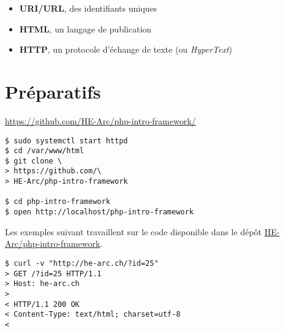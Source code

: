 \begin{itemize}
\tightlist
\item
  \textbf{URI/URL}, des identifiants uniques
\item
  \textbf{HTML}, un langage de publication
\item
  \textbf{HTTP}, un protocole d'échange de texte (ou \emph{HyperText})
\end{itemize}

\hypertarget{pruxe9paratifs}{%
\section{Préparatifs}\label{pruxe9paratifs}}

\href{https://github.com/HE-Arc/php-intro-framework}{https://github.com/HE-Arc/php-intro-framework/}

\begin{english}

\begin{verbatim}
$ sudo systemctl start httpd
$ cd /var/www/html
$ git clone \
> https://github.com/\
> HE-Arc/php-intro-framework

$ cd php-intro-framework
$ open http://localhost/php-intro-framework
\end{verbatim}

\end{english}

Les exemples suivant travaillent sur le code disponible dans le dépôt
\href{https://github.com/HE-Arc/php-intro-framework}{HE-Arc/php-intro-framework}.

\begin{english}

\begin{verbatim}
$ curl -v "http://he-arc.ch/?id=25"
> GET /?id=25 HTTP/1.1
> Host: he-arc.ch
>
< HTTP/1.1 200 OK
< Content-Type: text/html; charset=utf-8
<
\end{verbatim}

\end{english}

\begin{english}

\begin{Shaded}
\begin{Highlighting}[]
\DataTypeTok{\textgreater{}}
\KeywordTok{\textless{}p\textgreater{}}\NormalTok{Hello}
\end{Highlighting}
\end{Shaded}

\end{english}

